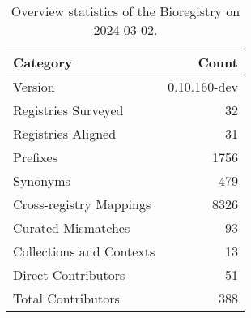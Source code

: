 \begin{table}
\caption{Overview statistics of the Bioregistry on 2024-03-02.}
\label{tab:bioregistry-summary}
\begin{tabular}{lr}
\toprule
Category & Count \\
\midrule
Version & 0.10.160-dev \\
Registries Surveyed & 32 \\
Registries Aligned & 31 \\
Prefixes & 1756 \\
Synonyms & 479 \\
Cross-registry Mappings & 8326 \\
Curated Mismatches & 93 \\
Collections and Contexts & 13 \\
Direct Contributors & 51 \\
Total Contributors & 388 \\
\bottomrule
\end{tabular}
\end{table}
